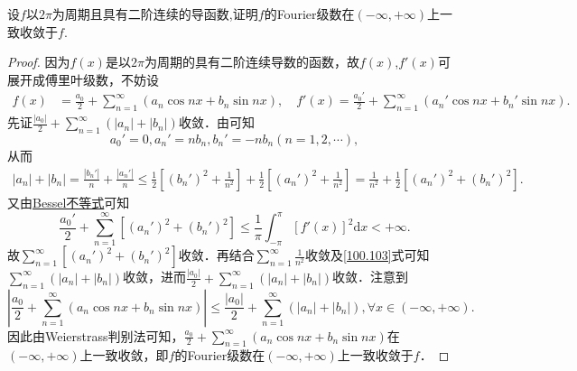\documentclass[../../main.tex]{subfiles}%
\begin{document}
\begin{example}
设$f$以$2\pi$为周期且具有二阶连续的导函数,证明$f$的Fourier级数在$(-\infty,+\infty)$上一致收敛于$f$.
\end{example}
\begin{proof}

因为$f(x)$是以$2\pi$为周期的具有二阶连续导数的函数，故$f(x)$,$f'(x)$可展开成傅里叶级数，不妨设
\begin{align*}
f(x) &=\frac{a_0}{2}+\sum_{n=1}^{\infty}(a_n\cos nx+b_n\sin nx),\quad f'(x)=\frac{a_{0}'}{2}+\sum_{n=1}^{\infty}(a_{n}'\cos nx+b_{n}'\sin nx).
\end{align*}
先证$\frac{|a_0|}{2}+\sum_{n=1}^{\infty}(|a_n|+|b_n|)$收敛．由可知
$$a_{0}'=0,a_{n}'=nb_n,b_{n}'=-nb_n(n=1,2,\cdots),$$
从而
\begin{align}
|a_n|+|b_n|=\frac{|b_{n}'|}{n}+\frac{|a_{n}'|}{n}\leqslant \frac{1}{2}\left[(b_{n}')^2+\frac{1}{n^2}\right]+\frac{1}{2}\left[(a_{n}')^2+\frac{1}{n^2}\right]
=\frac{1}{n^2}+\frac{1}{2}\left[(a_{n}')^2+(b_{n}')^2\right].\label{100.103}
\end{align}
又由\hyperref[theorem:Bessel不等式]{Bessel不等式}可知
$$\frac{a_{0}'}{2}+\sum_{n=1}^{\infty}\left[(a_{n}')^2+(b_{n}')^2\right]\leqslant \frac{1}{\pi}\int_{-\pi}^{\pi}[f'(x)]^2\mathrm{d}x<+\infty.$$
故$\sum_{n=1}^{\infty}\left[(a_{n}')^2+(b_{n}')^2\right]$收敛．再结合$\sum_{n=1}^{\infty}\frac{1}{n^2}$收敛及\eqref{100.103}式可知$\sum_{n=1}^{\infty}(|a_n|+|b_n|)$收敛，进而$\frac{|a_0|}{2}+\sum_{n=1}^{\infty}(|a_n|+|b_n|)$收敛．注意到
$$\left|\frac{a_0}{2}+\sum_{n=1}^{\infty}(a_n\cos nx+b_n\sin nx)\right|\leqslant \frac{|a_0|}{2}+\sum_{n=1}^{\infty}(|a_n|+|b_n|),\forall x\in(-\infty,+\infty).$$
因此由Weierstrass判别法可知，$\frac{a_0}{2}+\sum_{n=1}^{\infty}(a_n\cos nx+b_n\sin nx)$在$(-\infty,+\infty)$上一致收敛，即$f$的Fourier级数在$(-\infty,+\infty)$上一致收敛于$f$．

\end{proof}
\end{document}

